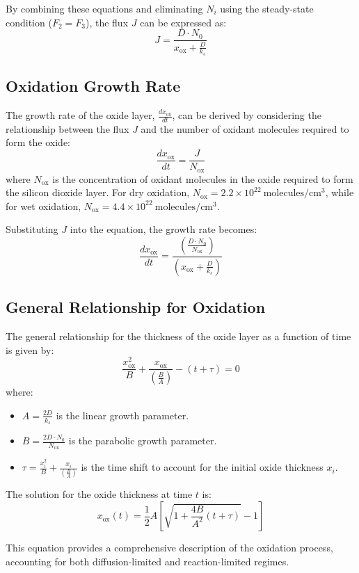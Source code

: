 \documentclass{report}
\begin{document}
By combining these equations and eliminating $N_i$ using the steady-state condition ($F_2 = F_3$), the flux $J$ can be expressed as:
$$
J = \frac{D \cdot N_0}{x_{\text{ox}} + \frac{D}{k_s}}
$$

\subsection{Oxidation Growth Rate}

The growth rate of the oxide layer, $\frac{dx_{\text{ox}}}{dt}$, can be derived by considering the relationship between the flux $J$ and the number of oxidant molecules required to form the oxide:
$$
\frac{dx_{\text{ox}}}{dt} = \frac{J}{N_{\text{ox}}}
$$
where $N_{\text{ox}}$ is the concentration of oxidant molecules in the oxide required to form the silicon dioxide layer. For dry oxidation, $N_{\text{ox}} = 2.2 \times 10^{22}~\text{molecules}/\text{cm}^3$, while for wet oxidation, $N_{\text{ox}} = 4.4 \times 10^{22}~\text{molecules}/\text{cm}^3$.

Substituting $J$ into the equation, the growth rate becomes:
$$
\frac{dx_{\text{ox}}}{dt} = \frac{\left(\frac{D \cdot N_0}{N_{\text{ox}}}\right)}{\left(x_{\text{ox}} + \frac{D}{k_s}\right)}
$$

\subsection{General Relationship for Oxidation}

The general relationship for the thickness of the oxide layer as a function of time is given by:
$$
\frac{x_{\text{ox}}^2}{B} + \frac{x_{\text{ox}}}{\left(\frac{B}{A}\right)} - (t + \tau) = 0
$$
where:
\begin{itemize}
    \item $A = \frac{2D}{k_s}$ is the linear growth parameter.
    \item $B = \frac{2D \cdot N_0}{N_{\text{ox}}}$ is the parabolic growth parameter.
    \item $\tau = \frac{x_i^2}{B} + \frac{x_i}{\left(\frac{B}{A}\right)}$ is the time shift to account for the initial oxide thickness $x_i$.
\end{itemize}

The solution for the oxide thickness at time $t$ is:
$$
x_{\text{ox}}(t) = \frac{1}{2}A \left[\sqrt{1 + \frac{4B}{A^2}(t + \tau)} - 1\right]
$$

This equation provides a comprehensive description of the oxidation process, accounting for both diffusion-limited and reaction-limited regimes.
\end{document}
